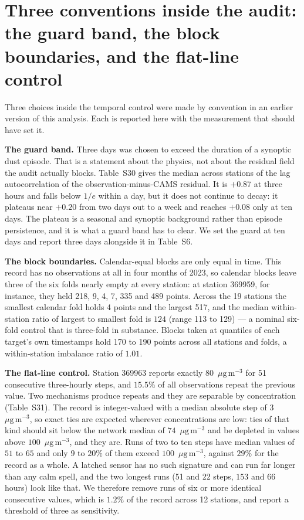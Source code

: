 \documentclass[11pt]{article}
\newcommand*{\ugm}{\ensuremath{\mu\mathrm{g\,m^{-3}}}}
\begin{document}
\section{Three conventions inside the audit: the guard band, the block boundaries, and the flat-line control}
Three choices inside the temporal control were made by convention in an earlier version of
this analysis. Each is reported here with the measurement that should have set it.

\textbf{The guard band.} Three days was chosen to exceed the duration of a synoptic dust
episode. That is a statement about the physics, not about the residual field the audit
actually blocks. Table~S30 gives the median across stations of the lag autocorrelation of
the observation-minus-CAMS residual. It is $+0.87$ at three hours and falls below $1/e$
within a day, but it does not continue to decay: it plateaus near $+0.20$ from two days
out to a week and reaches $+0.08$ only at ten days. The plateau is a seasonal and synoptic
background rather than episode persistence, and it is what a guard band has to clear. We
set the guard at ten days and report three days alongside it in Table~S6.

\textbf{The block boundaries.} Calendar-equal blocks are only equal in time. This record
has no observations at all in four months of 2023, so calendar blocks leave three of the
six folds nearly empty at every station: at station 369959, for instance, they held 218,
9, 4, 7, 335 and 489 points. Across the 19 stations the smallest calendar fold holds 4
points and the largest 517, and the median within-station ratio of largest to smallest
fold is $124$ (range 113 to 129) --- a nominal six-fold control that is three-fold in
substance. Blocks taken at quantiles of each target's own timestamps hold 170 to 190
points across all stations and folds, a within-station imbalance ratio of $1.01$.

\textbf{The flat-line control.} Station 369963 reports exactly $80$~\ugm{} for 51
consecutive three-hourly steps, and $15.5\%$ of all observations repeat the previous
value. Two mechanisms produce repeats and they are separable by concentration (Table~S31).
The record is integer-valued with a median absolute step of $3$~\ugm{}, so exact ties are
expected wherever concentrations are low: ties of that kind should sit below the network
median of $74$~\ugm{} and be depleted in values above $100$~\ugm{}, and they are. Runs of
two to ten steps have median values of $51$ to $65$ and only $9$ to $20\%$ of them exceed
$100$~\ugm{}, against $29\%$ for the record as a whole. A latched sensor has no such
signature and can run far longer than any calm spell, and the two longest runs
(51 and 22 steps, $153$ and $66$ hours) look like that. We therefore remove runs of six or more
identical consecutive values, which is $1.2\%$ of the record across 12 stations, and
report a threshold of three as sensitivity.
\end{document}
